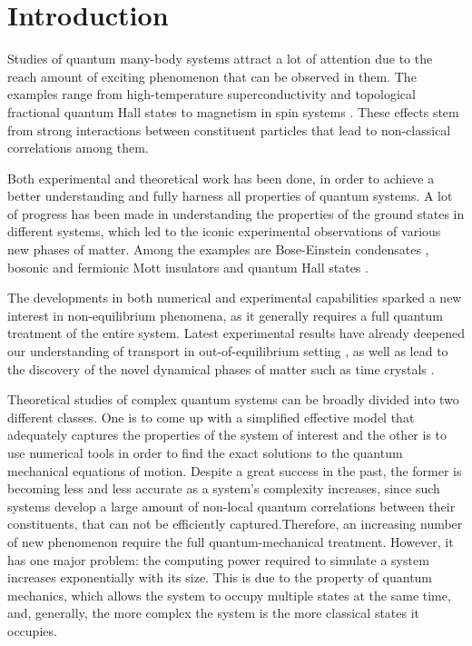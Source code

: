 \chapter{Introduction}
\label{introduction}

Studies of quantum many-body systems attract a lot of attention due to the reach amount of exciting phenomenon that can be observed in them. The examples range from high-temperature superconductivity \cite{Rev. Mod. Phys. 78, 17 (2006)} and topological fractional quantum Hall states \cite{Rev. Mod. Phys. 71, S298 (1999)} to magnetism in spin systems \cite{. Auerbach, Interacting Electrons and Quantum Magnetism (Springer, 1994)}. These effects stem from strong interactions between constituent particles that lead to non-classical correlations among them.

Both experimental and theoretical work has been done, in order to achieve a better understanding and fully harness all properties of quantum systems. A lot of progress has been made in understanding the properties of the ground states in different systems, which led to the iconic experimental observations of various new phases of matter. Among the examples are Bose-Einstein condensates \cite{wolfang, cornell}, bosonic \cite{Greiner2002} and fermionic \cite{tilman} Mott insulators and quantum Hall states \cite{quantum hall}. 

The developments in both numerical and experimental capabilities sparked a new interest in non-equilibrium phenomena, as it generally requires a full quantum treatment of the entire system. Latest experimental results have already deepened our understanding of transport in out-of-equilibrium setting \cite{tilman}, as well as lead to the discovery of the novel dynamical phases of matter such as time crystals \cite{mich monroe}.

Theoretical studies of complex quantum systems can be broadly divided into two different classes. One is to come up with a simplified effective model that adequately captures the properties of the system of interest and the other is to use numerical tools in order to find the exact solutions to the quantum mechanical equations of motion. Despite a great success in the past\cite{Gross pitaevski, femi liquid}, the former is becoming less and less accurate as a system's complexity increases, since such systems develop a large amount of non-local quantum correlations between their constituents, that can not be efficiently captured.Therefore, an increasing number of new phenomenon require the full quantum-mechanical treatment. However, it has one major problem: the computing power required to simulate a system increases exponentially with its size. This is due to the property of quantum mechanics, which allows the system to occupy multiple states at the same time, and, generally, the more complex the system is the more classical states it occupies.

